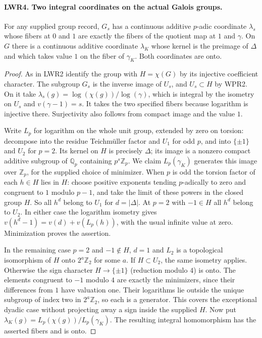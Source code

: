\paragraph{LWR4. Two integral coordinates on the actual Galois groups.}
\label{claim:LWR4}
For any supplied group record, $G_s$ has a continuous additive
$p$-adic coordinate $\lambda_s$ whose fibers at $0$ and $1$ are
exactly the fibers of the quotient map at $1$ and $\gamma$.
On $G$ there is a continuous additive coordinate $\lambda_K$ whose
kernel is the preimage of $\Delta$ and which takes value $1$ on the
fiber of $\gamma_K$. Both coordinates are onto.

\begin{proof}
As in LWR2 identify the group with $H=\chi(G)$ by its injective
coefficient character. The subgroup $G_s$ is the inverse image of
$U_s$, and $U_s\subset H$ by WPR2. On it take
$\lambda_s(g)=\log(\chi(g))/\log(\gamma)$, which is integral by
the isometry on $U_s$ and $v(\gamma-1)=s$. It takes the two
specified fibers because logarithm is injective there. Surjectivity
also follows from compact image and the value $1$.

Write $L_p$ for logarithm on the whole unit group, extended by zero
on torsion: decompose into the residue Teichm\"uller factor and
$U_1$ for odd $p$, and into $\{\pm1\}$ and $U_2$ for $p=2$.
Its kernel on $H$ is precisely $\Delta$; its image is a nonzero
compact additive subgroup of $\mathbb Q_p$ containing $p^s\mathbb Z_p$.
We claim $L_p(\gamma_K)$ generates this image over $\mathbb Z_p$,
for the supplied choice of minimizer. When $p$ is odd the torsion
factor of each $h\in H$ lies in $H$: choose positive exponents
tending $p$-adically to zero and congruent to $1$ modulo $p-1$,
and take the limit of these powers in the closed group $H$.
So all $h^d$ belong to $U_1$ for $d=|\Delta|$. At $p=2$ with
$-1\in H$ all $h^d$ belong to $U_2$. In either case the logarithm
isometry gives $v(h^d-1)=v(d)+v(L_p(h))$, with the usual infinite
value at zero. Minimization proves the assertion.

In the remaining case $p=2$ and $-1\notin H$, $d=1$ and $L_2$ is
a topological isomorphism of $H$ onto $2^a\mathbb Z_2$ for some
$a$. If $H\subset U_2$, the same isometry applies. Otherwise the
sign character $H\to\{\pm1\}$ (reduction modulo $4$) is onto.
The elements congruent to $-1$ modulo $4$ are exactly the minimizers,
since their differences from $1$ have valuation one. Their logarithms
lie outside the unique subgroup of index two in $2^a\mathbb Z_2$,
so each is a generator. This covers the exceptional dyadic case
without projecting away a sign inside the supplied $H$. Now put
$\lambda_K(g)=L_p(\chi(g))/L_p(\gamma_K)$. The resulting integral
homomorphism has the asserted fibers and is onto.
\end{proof}


